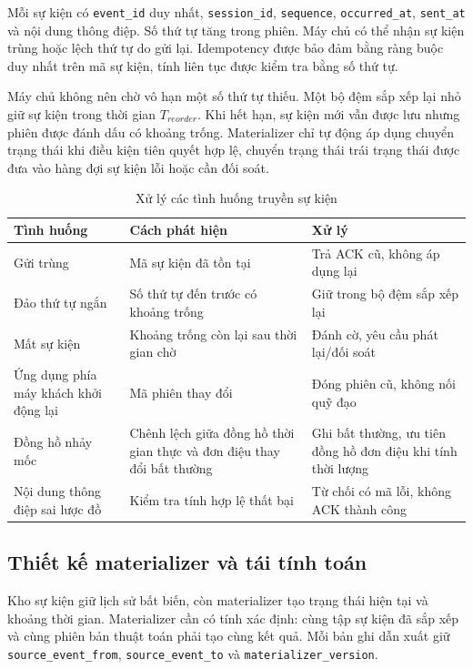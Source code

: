 Mỗi sự kiện có \texttt{event\_id} duy nhất, \texttt{session\_id}, \texttt{sequence}, \texttt{occurred\_at}, \texttt{sent\_at} và nội dung thông điệp. Số thứ tự tăng trong phiên. Máy chủ có thể nhận sự kiện trùng hoặc lệch thứ tự do gửi lại. Idempotency được bảo đảm bằng ràng buộc duy nhất trên mã sự kiện, tính liên tục được kiểm tra bằng số thứ tự.

Máy chủ không nên chờ vô hạn một số thứ tự thiếu. Một bộ đệm sắp xếp lại nhỏ giữ sự kiện trong thời gian $T_{reorder}$. Khi hết hạn, sự kiện mới vẫn được lưu nhưng phiên được đánh dấu có khoảng trống. Materializer chỉ tự động áp dụng chuyển trạng thái khi điều kiện tiên quyết hợp lệ, chuyển trạng thái trái trạng thái được đưa vào hàng đợi sự kiện lỗi hoặc cần đối soát.

\begin{table}[H]
\centering
\caption{Xử lý các tình huống truyền sự kiện}
\label{tab:event-delivery-cases}
\begin{tabularx}{\textwidth}{p{3.4cm}X X}
\toprule
\textbf{Tình huống} & \textbf{Cách phát hiện} & \textbf{Xử lý}\\
\midrule
Gửi trùng & Mã sự kiện đã tồn tại & Trả ACK cũ, không áp dụng lại\\
Đảo thứ tự ngắn & Số thứ tự đến trước có khoảng trống & Giữ trong bộ đệm sắp xếp lại\\
Mất sự kiện & Khoảng trống còn lại sau thời gian chờ & Đánh cờ, yêu cầu phát lại/đối soát\\
Ứng dụng phía máy khách khởi động lại & Mã phiên thay đổi & Đóng phiên cũ, không nối quỹ đạo\\
Đồng hồ nhảy mốc & Chênh lệch giữa đồng hồ thời gian thực và đơn điệu thay đổi bất thường & Ghi bất thường, ưu tiên đồng hồ đơn điệu khi tính thời lượng\\
Nội dung thông điệp sai lược đồ & Kiểm tra tính hợp lệ thất bại & Từ chối có mã lỗi, không ACK thành công\\
\bottomrule
\end{tabularx}
\end{table}

\subsection{Thiết kế materializer và tái tính toán}
Kho sự kiện giữ lịch sử bất biến, còn materializer tạo trạng thái hiện tại và khoảng thời gian. Materializer cần có tính xác định: cùng tập sự kiện đã sắp xếp và cùng phiên bản thuật toán phải tạo cùng kết quả. Mỗi bản ghi dẫn xuất giữ \texttt{source\_event\_from}, \texttt{source\_event\_to} và \texttt{materializer\_version}.

